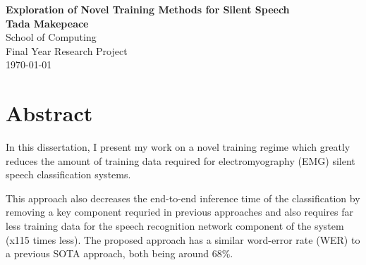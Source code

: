 \documentclass[12pt, a4paper]{report}
\begin{document}
\thispagestyle{empty}	%
\vspace*{1mm}	%
\vspace{10mm}

\begin{center}
\huge\textbf{\textsf{Exploration of Novel Training Methods for Silent Speech}}\\
\vspace{15mm}
\large \textbf{Tada Makepeace}\\


\vspace{10mm}
\normalsize School of Computing \\ Final Year Research Project \\

\vspace{20mm}
%
\today	%
\end{center}
\newpage
{}	%
\chapter*{Abstract}	%

In this dissertation, I present my work on a novel training regime which greatly
reduces the amount of training data required for electromyography (EMG)
silent speech classification
systems.

This approach also decreases the end-to-end inference time of the classification
by removing a key component requried in previous approaches and also requires
far less training data for the speech recognition network component of the system
(x115 times less). The proposed approach
has a similar word-error rate (WER) to a previous SOTA approach,
both being around 68\%.
\end{document}
